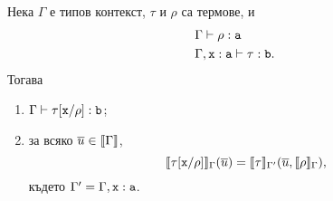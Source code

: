 \begin{framed}
\begin{lemma}\label{lem:pcf:substitution}
  Нека $\Gamma$ е типов контекст, $\tau$ и $\rho$ са термове, и
  \begin{align*}
    & \Gamma \vdash \rho : \texttt{a}\\
    & \Gamma, \texttt{x}:\texttt{a} \vdash \tau : \texttt{b}.
  \end{align*}
  Тогава
  \begin{enumerate}[1)]
  \item
    $\Gamma \vdash \tau[\texttt{x}/{\rho}] : \texttt{b}$;
  \item
    за всяко $\overline{u} \in \llbracket{\Gamma}\rrbracket$,
    \[\llbracket{\tau[\texttt{x}/{\rho}]}\rrbracket_\Gamma(\overline{u}) = \llbracket{\tau}\rrbracket_{\Gamma'}(\overline{u},\llbracket{\rho}\rrbracket_\Gamma),\]
    където $\Gamma' = \Gamma, \texttt{x}:\texttt{a}$.  
  \end{enumerate}
\end{lemma}
\end{framed}
